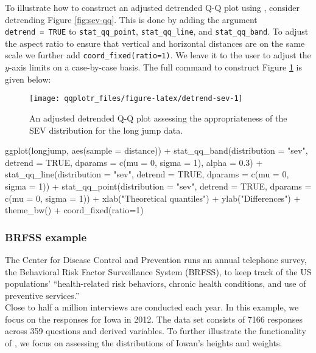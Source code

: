 \label{sec:detrending}

To illustrate how to construct an adjusted detrended Q-Q plot using
, consider detrending Figure \ref{fig:sev-qq}. This is done
by adding the argument \texttt{detrend\ =\ TRUE} to
\texttt{stat\_qq\_point}, \texttt{stat\_qq\_line}, and
\texttt{stat\_qq\_band}. To adjust the aspect ratio to ensure that
vertical and horizontal distances are on the same scale we further add
\texttt{coord\_fixed(ratio=1)}. We leave it to the user to adjust the
\(y\)-axis limits on a case-by-case basis. The full command to construct
Figure \ref{fig:detrend-sev} is given below:

\begin{Schunk}
\begin{figure}

{\centering \texttt{[image: qqplotr\_files/figure-latex/detrend-sev-1]} 

}

\caption[An adjusted detrended Q-Q plot assessing the appropriateness of the SEV distribution for the long jump data]{An adjusted detrended Q-Q plot assessing the appropriateness of the SEV distribution for the long jump data.}\label{fig:detrend-sev}
\end{figure}
\end{Schunk}

\begin{Schunk}
\begin{Sinput}
ggplot(longjump, aes(sample = distance)) +
  stat_qq_band(distribution = "sev", detrend = TRUE, dparams = c(mu = 0, sigma = 1),  
               alpha = 0.3) +
  stat_qq_line(distribution = "sev", detrend = TRUE, dparams = c(mu = 0, sigma = 1)) +
  stat_qq_point(distribution = "sev", detrend = TRUE, dparams = c(mu = 0, sigma = 1)) +
  xlab("Theoretical quantiles") +
  ylab("Differences") +
  theme_bw() +
  coord_fixed(ratio=1)
\end{Sinput}
\end{Schunk}

\subsubsection{BRFSS example}\label{brfss-example}

\label{sec:brfss}

The Center for Disease Control and Prevention runs an annual telephone
survey, the Behavioral Risk Factor Surveillance System (BRFSS), to keep
track of the US populations' ``health-related risk behaviors, chronic
health conditions, and use of preventive services.''
\\
Close to half a million interviews are conducted each year. In this
example, we focus on the responses for Iowa in 2012. The data set
consists of 7166 responses across 359 questions and derived variables.
To further illustrate the functionality of , we focus on
assessing the distributions of Iowan's heights and weights.

